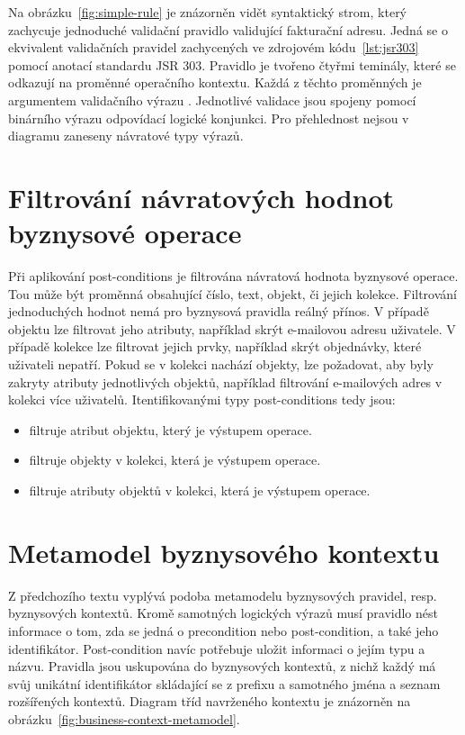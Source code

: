 Na obrázku~\ref{fig:simple-rule} je znázorněn vidět syntaktický strom, který zachycuje jednoduché
validační pravidlo validující fakturační adresu. Jedná se o ekvivalent validačních pravidel
zachycených ve zdrojovém kódu~\ref{lst:jsr303} pomocí anotací standardu \gls{JSR} 303.
Pravidlo je tvořeno čtyřmi teminály, které se odkazují na proměnné operačního kontextu.
Každá z těchto proměnných je argumentem validačního výrazu . Jednotlivé validace
jsou spojeny pomocí binárního výrazu  odpovídací logické konjunkci.
Pro přehlednost nejsou v diagramu zaneseny návratové typy výrazů.

\section{Filtrování návratových hodnot byznysové operace}

Při aplikování post-conditions je filtrována návratová hodnota byznysové operace. Tou může být proměnná
obsahující číslo, text, objekt, či jejich kolekce. Filtrování jednoduchých hodnot nemá pro byznysová pravidla reálný přínos.
V případě objektu lze filtrovat jeho atributy, například skrýt e-mailovou adresu uživatele.
V případě kolekce lze filtrovat jejich prvky, například skrýt objednávky, které uživateli nepatří.
Pokud se v kolekci nachází objekty, lze požadovat, aby byly zakryty atributy jednotlivých objektů,
například filtrování e-mailových adres v kolekci více uživatelů. Itentifikovanými typy post-conditions tedy jsou:

\begin{itemize}
    \item {} filtruje atribut objektu, který je výstupem operace.
    \item {} filtruje objekty v kolekci, která je výstupem operace.
    \item {} filtruje atributy objektů v kolekci, která je výstupem operace.
\end{itemize}

\section{Metamodel byznysového kontextu}\label{sec:metamodel}

Z předchozího textu vyplývá podoba metamodelu byznysových pravidel, resp. byznysových kontextů.
Kromě samotných logických výrazů musí pravidlo nést informace o tom, zda
se jedná o precondition nebo post-condition, a také jeho identifikátor.
Post-condition navíc potřebuje uložit informaci o jejím typu a názvu. Pravidla jsou uskupována
do byznysových kontextů, z nichž každý má svůj unikátní identifikátor skládající se z prefixu
a samotného jména a seznam rozšířených kontextů. Diagram tříd navrženého kontextu je znázorněn
na obrázku~\ref{fig:business-context-metamodel}.

